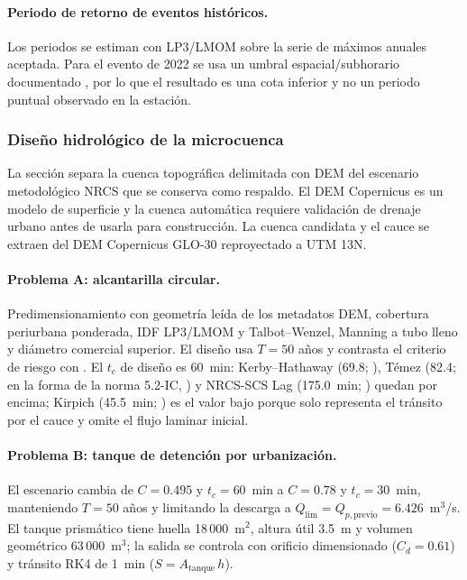 \paragraph{Periodo de retorno de eventos históricos.} Los periodos se estiman con LP3/LMOM sobre la serie de máximos
anuales aceptada. Para el evento de 2022 se usa un umbral espacial/subhorario documentado \citep{accuweather2022}, por lo que el resultado es
una cota inferior y no un periodo puntual observado en la estación.

\subsubsection{Diseño hidrológico de la microcuenca}
La sección separa la cuenca topográfica delimitada con DEM del escenario metodológico NRCS que se conserva como
respaldo. El DEM Copernicus es un modelo de superficie y la cuenca automática requiere validación de drenaje urbano
antes de usarla para construcción. La cuenca candidata y el cauce se extraen del DEM Copernicus GLO-30 \citep{esa_copdem} reproyectado a
UTM 13N.

\paragraph{Problema A: alcantarilla circular.} Predimensionamiento con geometría leída de los metadatos DEM, cobertura
periurbana ponderada, IDF LP3/LMOM y Talbot--Wenzel, Manning a tubo lleno y diámetro comercial superior. El diseño usa
$T=50$ años y contrasta el criterio de riesgo con \citet{chow1988}. El $t_c$ de diseño es 60~min: Kerby--Hathaway
(69.8; \citealp{txdot_hdm}), Témez (82.4; en la forma de la norma 5.2-IC, \citealp{fom2016}) y NRCS-SCS Lag (175.0~min; \citealp{nrcs2010cap15}) quedan por encima; Kirpich (45.5~min; \citealp{txdot_hdm}) es el valor bajo porque solo
representa el tránsito por el cauce y omite el flujo laminar inicial.

\paragraph{Problema B: tanque de detención por urbanización.} El escenario cambia de $C=0.495$ y $t_c=60$~min a
$C=0.78$ y $t_c=30$~min, manteniendo $T=50$ años y limitando la descarga a $Q_\mathrm{lim}=Q_{p,\mathrm{previo}}=
6.426$~m$^3$/s. El tanque prismático tiene huella 18\,000~m$^2$, altura útil 3.5~m y volumen geométrico
63\,000~m$^3$; la salida se controla con orificio dimensionado ($C_d = 0.61$) y tránsito RK4 de 1~min
($S = A_\mathrm{tanque}\,h$).

